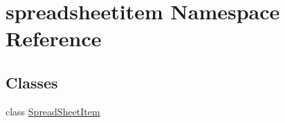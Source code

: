 \hypertarget{namespacespreadsheetitem}{}\section{spreadsheetitem Namespace Reference}
\label{namespacespreadsheetitem}
\subsection*{Classes}
\begin{DoxyCompactItemize}
\item 
class \hyperlink{classspreadsheetitem_1_1SpreadSheetItem}{Spread\+Sheet\+Item}
\end{DoxyCompactItemize}
